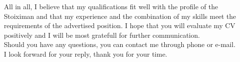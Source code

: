 \documentclass[11pt, a4paper]{awesome-cv}
\begin{document}
\begin{cvletter}
All in all, I believe that my qualifications fit well with the profile of the Stoiximan and that my experience and the combination of my skills meet the requirements of the advertised position. I hope that you will evaluate my CV positively and I will be most gratefull for further communication.\\
Should you have any questions, you can contact me through phone or e-mail.\\
I look forward for your reply, thank you for your time.

\end{cvletter}


\makeletterclosing
\end{document}
